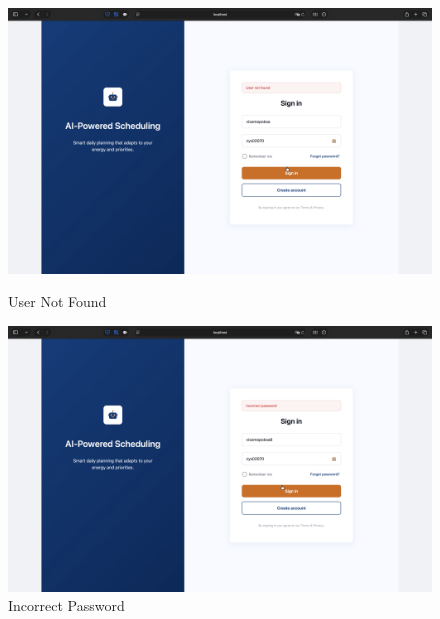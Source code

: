 \documentclass[12pt, a4paper]{article}
\begin{document}
\begin{enumerate}
                    \begin{figure}[H]
                        \begin{minipage}[t]{0.49\textwidth}
                            \centering
                            \includegraphics[width=\textwidth]{Images/System/login/username.png}
                            \caption{User Not Found}
                            \label{login_wrong_username}
                        \end{minipage}
                        \hfill
                        \begin{minipage}[t]{0.49\textwidth}
                            \centering
                            \includegraphics[width=\textwidth]{Images/System/login/password.png}
                            \caption{Incorrect Password}
                            \label{login_wrong_password}
                        \end{minipage}
                    \end{figure}
            

\end{enumerate}
\end{document}
